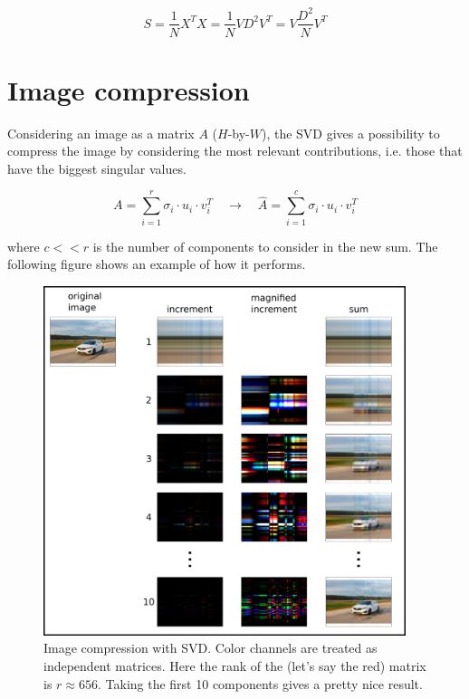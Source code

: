 \documentclass{article}
\begin{document}
\begin{equation}
    S = \frac1N X^TX = \frac1N VD^2V^T = V \frac{D^2}{N} V^T
\end{equation}

\newpage
\section{Image compression}

Considering an image as a matrix $A$ ($H$-by-$W$), the SVD gives a possibility to compress the image by considering the most relevant contributions, i.e. those that have the biggest singular values.

\begin{equation}
    A = \sum_{i=1}^{r} \sigma_i \cdot u_i \cdot v^T_i \quad \to \quad \hat{A} = \sum_{i=1}^{c} \sigma_i \cdot u_i \cdot v^T_i
\end{equation}

where $c << r$ is the number of components to consider in the new sum. The following figure shows an example of how it performs.

\begin{figure}[ht]
 \centering
  \includegraphics[width=300pt]{images/img_compression.png}
 \caption{Image compression with SVD. Color channels are treated as independent matrices. Here the rank of the (let's say the red) matrix is $r\approx 656$. Taking the first 10 components gives a pretty nice result.}
\end{figure}
\end{document}

